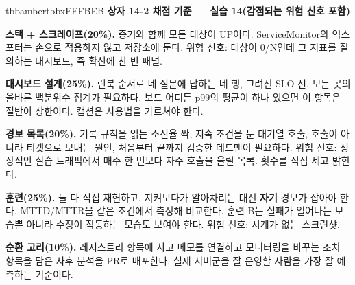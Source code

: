 \begin{calloutbox}{tbbamber}{tbbxFFFBEB}
{\normalsize\bfseries\color{tbbx92400E}상자 14-2  채점 기준 — 실습 14(감점되는 위험 신호 포함)}\par\vspace{3pt}
\begin{tbbitemize}
  \item \textbf{스택 + 스크레이프(20\%).} 증거와 함께 모든 대상이 UP이다. ServiceMonitor와 익스포터는 손으로 적용하지 않고 저장소에 둔다. 위험 신호: 대상이 0/N인데 그 지표를 질의하는 대시보드, 즉 확신에 찬 빈 패널.
  \item \textbf{대시보드 설계(25\%).} 런북 순서로 네 질문에 답하는 네 행, 그려진 SLO 선, 모든 곳의 올바른 백분위수 집계가 필요하다. 보드 어디든 p99의 평균이 하나 있으면 이 항목은 절반이 상한이다. 캡션은 사용법을 가르쳐야 한다.
  \item \textbf{경보 목록(20\%).} 기록 규칙을 읽는 소진율 짝, 지속 조건을 둔 대기열 호출, 호출이 아니라 티켓으로 보내는 원인, 처음부터 끝까지 검증한 데드맨이 필요하다. 위험 신호: 정상적인 실습 트래픽에서 매주 한 번보다 자주 호출을 울릴 목록. 횟수를 직접 세고 밝힌다.
  \item \textbf{훈련(25\%).} 둘 다 직접 재현하고, 지켜보다가 알아차리는 대신 \textbf{자기} 경보가 잡아야 한다. MTTD/MTTR을 같은 조건에서 측정해 비교한다. 훈련 B는 실패가 일어나는 모습뿐 아니라 수정이 작동하는 모습도 보여야 한다. 위험 신호: 시계가 없는 스크린샷.
  \item \textbf{순환 고리(10\%).} 레지스트리 항목에 사고 메모를 연결하고 모니터링을 바꾸는 조치 항목을 담은 사후 분석을 PR로 배포한다. 실제 서버군을 잘 운영할 사람을 가장 잘 예측하는 기준이다.
\end{tbbitemize}
\end{calloutbox}


